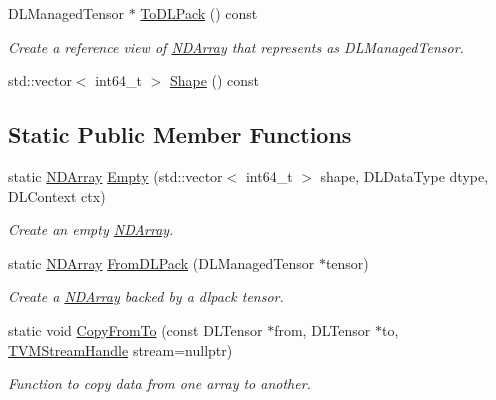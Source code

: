 \begin{DoxyCompactItemize}
D\+L\+Managed\+Tensor $\ast$ \hyperlink{classtvm_1_1runtime_1_1NDArray_ada8b2d6986e62b733f2c6c9c03df2dfe}{To\+D\+L\+Pack} () const 
\begin{DoxyCompactList}\small\item\em Create a reference view of \hyperlink{classtvm_1_1runtime_1_1NDArray}{N\+D\+Array} that represents as D\+L\+Managed\+Tensor. \end{DoxyCompactList}\item 
std\+::vector$<$ int64\+\_\+t $>$ \hyperlink{classtvm_1_1runtime_1_1NDArray_a04129f44f5d17ab63a10e107a939f282}{Shape} () const 
\end{DoxyCompactItemize}
\subsection*{Static Public Member Functions}
\begin{DoxyCompactItemize}
\item 
static \hyperlink{classtvm_1_1runtime_1_1NDArray}{N\+D\+Array} \hyperlink{classtvm_1_1runtime_1_1NDArray_a2ca068cfab0b928e5809631c1bec64e7}{Empty} (std\+::vector$<$ int64\+\_\+t $>$ shape, D\+L\+Data\+Type dtype, D\+L\+Context ctx)
\begin{DoxyCompactList}\small\item\em Create an empty \hyperlink{classtvm_1_1runtime_1_1NDArray}{N\+D\+Array}. \end{DoxyCompactList}\item 
static \hyperlink{classtvm_1_1runtime_1_1NDArray}{N\+D\+Array} \hyperlink{classtvm_1_1runtime_1_1NDArray_abec485628a0ca451b668c42fd8fa691a}{From\+D\+L\+Pack} (D\+L\+Managed\+Tensor $\ast$tensor)
\begin{DoxyCompactList}\small\item\em Create a \hyperlink{classtvm_1_1runtime_1_1NDArray}{N\+D\+Array} backed by a dlpack tensor. \end{DoxyCompactList}\item 
static void \hyperlink{classtvm_1_1runtime_1_1NDArray_ae2a878fb8c847666d2318b979714cefa}{Copy\+From\+To} (const D\+L\+Tensor $\ast$from, D\+L\+Tensor $\ast$to, \hyperlink{c__runtime__api_8h_ab1d5f6b7945e1410602a8a057fda5757}{T\+V\+M\+Stream\+Handle} stream=nullptr)
\begin{DoxyCompactList}\small\item\em Function to copy data from one array to another. \end{DoxyCompactList}\end{DoxyCompactItemize}
